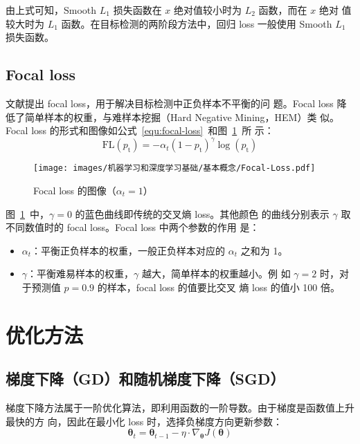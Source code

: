 由上式可知，Smooth $L_1$ 损失函数在 $x$ 绝对值较小时为 $L_2$ 函数，而在 $x$ 绝对
值较大时为 $L_1$ 函数。在目标检测的两阶段方法中，回归 loss 一般使用 Smooth $L_1$
损失函数。

\subsection{Focal loss}\label{subsec:focal}


文献提出 focal loss，用于解决目标检测中正负样本不平衡的问
题。Focal loss 降低了简单样本的权重，与难样本挖掘（Hard Negative Mining，HEM）类
似。Focal loss 的形式和图像如公式~\ref{equ:focal-loss}~和图~\ref{fig:focal-loss}~所
示：
\begin{equation}
  \label{equ:focal-loss}
  \mathrm{FL}(p_{\mathrm{t}}) = - \alpha_t {(1-p_{\mathrm{t}})}^{\gamma} \log (p_{\mathrm{t}})
\end{equation}

\begin{figure}[ht]
  \centering
  \texttt{[image: images/机器学习和深度学习基础/基本概念/Focal-Loss.pdf]}
  \caption{Focal loss 的图像（$\alpha_t = 1$）}\label{fig:focal-loss}
\end{figure}

图~\ref{fig:focal-loss}~中，$\gamma = 0$ 的蓝色曲线即传统的交叉熵 loss。其他颜色
的曲线分别表示 $\gamma$ 取不同数值时的 focal loss。Focal loss 中两个参数的作用
是：

\begin{itemize}
  \item $\alpha_t$：平衡正负样本的权重，一般正负样本对应的 $\alpha_t$ 之和为 1。
  \item $\gamma$：平衡难易样本的权重，$\gamma$ 越大，简单样本的权重越小。例
    如 $\gamma = 2$ 时，对于预测值 $p = 0.9$ 的样本，focal loss 的值要比交叉
    熵 loss 的值小 100 倍。
\end{itemize}

\section{优化方法}\label{sec:opt}

\subsection{梯度下降（GD）和随机梯度下降（SGD）}
梯度下降方法属于一阶优化算法，即利用函数的一阶导数。由于梯度是函数值上升最快的方
向，因此在最小化 loss 时，选择负梯度方向更新参数：
\begin{equation}
  \boldsymbol{\theta}_t = \boldsymbol{\theta}_{t-1} - \eta \cdot \nabla_{\boldsymbol{\theta}}J(\boldsymbol{\theta})
\end{equation}

